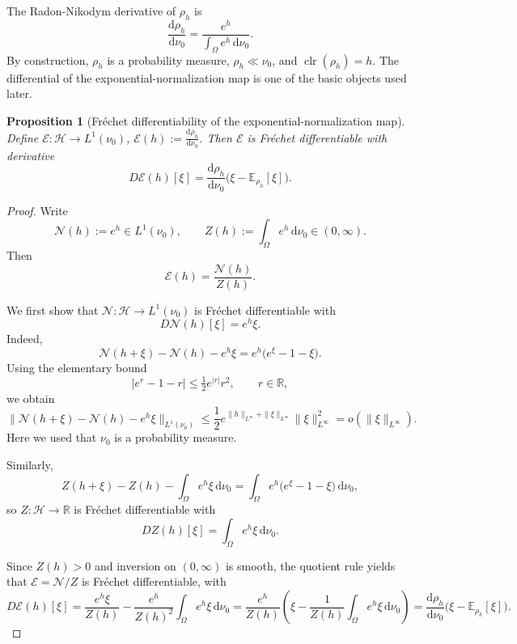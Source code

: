 \documentclass{article}
\newtheorem{proposition}[theorem]{Proposition}
\theoremstyle{definition}
\DeclareMathOperator{\clr}{clr}
\renewcommand{\d}{\mathrm{d}}
\begin{document}
The Radon-Nikodym derivative of $\rho_h$ is
\[
    \frac{\d\rho_h}{\d\nu_0}
    =
    \frac{e^h}{\int_\Omega e^h\,\d\nu_0}.
\]
By construction, \(\rho_h\) is a probability measure, \(\rho_h\ll \nu_0\), and $\clr(\rho_h)=h$. The differential of the exponential-normalization map is one of the basic objects used later.

\begin{proposition}[Fr\'echet differentiability of the exponential-normalization map]
    \label{prop:diff_exp_normalization}
    Define $\mathcal E:\mathcal H \to L^1(\nu_0)$, $\mathcal E(h):=\frac{\d\rho_h}{\d\nu_0}$.
    Then \(\mathcal E\) is Fr\'echet differentiable with derivative
    \begin{equation}
        \label{eq:diff_exp_normalization}
        D\mathcal E(h)[\xi]
        =
        \frac{\d\rho_h}{\d\nu_0}
        \bigl(\xi-\mathbb E_{\rho_h}[\xi]\bigr).
    \end{equation}
\end{proposition}

\begin{proof}
    Write
    \[
        \mathcal N(h):=e^h \in L^1(\nu_0),
        \qquad
        Z(h):=\int_\Omega e^h\,\d\nu_0 \in (0,\infty).
    \]
    Then
    \[
        \mathcal E(h)=\frac{\mathcal N(h)}{Z(h)}.
    \]

    We first show that \(\mathcal N:\mathcal H\to L^1(\nu_0)\) is Fr\'echet differentiable with
    \[
        D\mathcal N(h)[\xi]=e^h\xi.
    \]
    Indeed,
    \[
        \mathcal N(h+\xi)-\mathcal N(h)-e^h\xi
        =
        e^h\bigl(e^\xi-1-\xi\bigr).
    \]
    Using the elementary bound
    \[
        |e^r-1-r|\le \tfrac12 e^{|r|}r^2,
        \qquad r\in\mathbb R,
    \]
    we obtain
    \[
        \|\mathcal N(h+\xi)-\mathcal N(h)-e^h\xi\|_{L^1(\nu_0)}
        \le
        \frac12 e^{\|h\|_{L^\infty}+\|\xi\|_{L^\infty}}
        \|\xi\|_{L^\infty}^2
        =
        o(\|\xi\|_{L^\infty}).
    \]
    Here we used that \(\nu_0\) is a probability measure.

    Similarly,
    \[
        Z(h+\xi)-Z(h)-\int_\Omega e^h\xi\,\d\nu_0
        =
        \int_\Omega e^h\bigl(e^\xi-1-\xi\bigr)\,\d\nu_0,
    \]
    so \(Z:\mathcal H\to \mathbb R\) is Fr\'echet differentiable with
    \[
        DZ(h)[\xi]=\int_\Omega e^h\xi\,\d\nu_0.
    \]

    Since \(Z(h)>0\) and inversion on \((0,\infty)\) is smooth, the quotient rule yields that
    \(\mathcal E=\mathcal N/Z\) is Fr\'echet differentiable, with
    \[
        D\mathcal E(h)[\xi]
        =
        \frac{e^h\xi}{Z(h)}
        -
        \frac{e^h}{Z(h)^2}\int_\Omega e^h\xi\,\d\nu_0
        =
        \frac{e^h}{Z(h)}
        \left(
            \xi
            -
            \frac{1}{Z(h)}\int_\Omega e^h\xi\,\d\nu_0
        \right)
        =
        \frac{\d\rho_h}{\d\nu_0}
        \bigl(\xi-\mathbb E_{\rho_h}[\xi]\bigr).
    \]
\end{proof}
\end{document}
